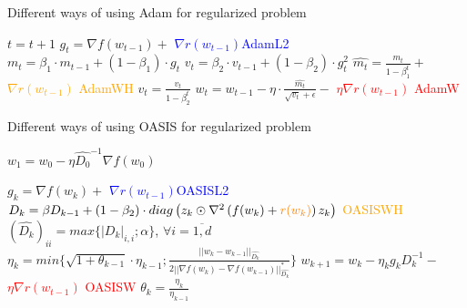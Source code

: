 \documentclass[USenglish]{article}
\theoremstyle{dgthm}
\theoremstyle{dgdef}
\begin{document}
\begin{algorithm}[H]
            \caption{Different ways of using Adam for regularized problem}
            \label{alg:genAdam}    
            \begin{algorithmic}
            \small{
            \State $t = t+1$
            \State $g_t = \nabla f(w_{t-1}) + $ \textcolor{blue}{$\nabla r(w_{t-1})$}\hfill \textcolor{blue}{AdamL2}
            \State $m_t = \beta_1 \cdot m_{t-1} + (1 - \beta_1) \cdot g_t$
            \State $v_t = \beta_2 \cdot v_{t-1} + (1 - \beta_2) \cdot g_t^2$
            \State $\hat{m_t} = \frac{m_t}{1-\beta_1^t} +$ \textcolor{orange}{$\nabla r(w_{t-1})$} \hfill \textcolor{orange}{AdamWH}
            \State $\hat{v_t} = \frac{v_t}{1-\beta_2^t}$ 
            \State $w_t = w_{t-1} - \eta \cdot \frac{\hat{m_t}}{\sqrt{v_t} + \epsilon} - $ \textcolor{red}{$\eta \nabla r(w_{t-1})$ } \hfill \textcolor{red}{AdamW}
            \EndWhile
            }
\end{algorithmic}
\end{algorithm}

\begin{algorithm}[H]
\caption{Different ways of using OASIS for regularized problem}\label{alg:OASIS}
\begin{algorithmic}
    \State $w_1 = w_0 - \eta \hat{D_0}^{-1} \nabla f(w_0)$

    \State $g_k = \nabla f(w_k) +$ \textcolor{blue}{$\nabla r(w_{t-1})$}\hfill \textcolor{blue}{OASISL2} 
    \State $D_k = \beta D_{k-1} + (1-\beta_2) \cdot diag\left( z_k \odot \nabla^2 \left(f(w_k) + \textcolor{orange}{r(w_k)} \right) z_k \right)$ \hfill \textcolor{orange}{OASISWH}
    \State $(\hat{D_k})_{ii} = max \{|D_k|_{i, i} ; \alpha \}$, $\forall i = \overline{1, d}$
    \State $\eta_k = min \{ \sqrt{1 + \theta_{k-1}} \cdot \eta_{k-1}; \frac{||w_k - w_{k-1}||_{\hat{D_k}}}{2 ||\nabla f(w_k) - \nabla f(w_{k-1}) ||_{\hat{D_k}}^* } \}$
    \State $w_{k+1} = w_k - \eta_k g_k D_k^{-1}- $ \textcolor{red}{$\eta \nabla r(w_{t-1})$ } \hfill \textcolor{red}{OASISW} 
    \State $\theta_k = \frac{\eta_k}{\eta_{k-1}}$
    \EndFor
    
\end{algorithmic}
\end{algorithm}
\end{document}
